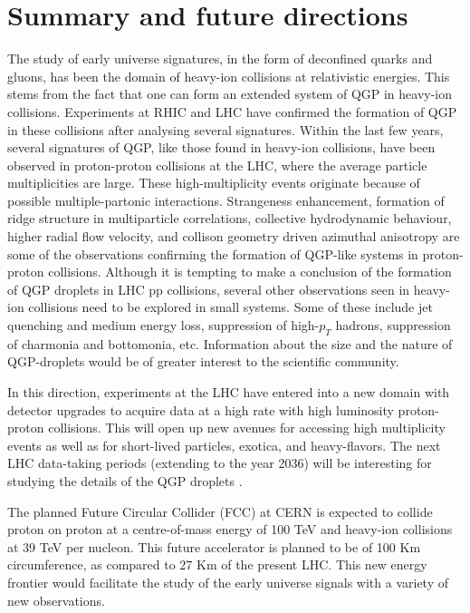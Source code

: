 \documentclass[showpacs,showkeys,aps,twocolumn]{revtex4}
\newcommand\+{\dagger}
\begin{document}
\section{Summary and future directions}
The study of early universe signatures, in the form of deconfined quarks and gluons, has been the domain of heavy-ion collisions at relativistic energies. This stems from the fact that one can form an extended system of  QGP in heavy-ion collisions. Experiments at RHIC and LHC have confirmed the formation of QGP in these collisions after analysing several signatures. Within the last few years, several signatures of QGP, like those found in  heavy-ion collisions, have been observed in proton-proton collisions at the LHC, where the average particle multiplicities are large. These high-multiplicity events originate because of possible multiple-partonic interactions. Strangeness enhancement, formation of ridge structure in multiparticle correlations, collective hydrodynamic behaviour, higher radial flow velocity, and collison geometry driven azimuthal anisotropy are some of the observations confirming  the formation of QGP-like systems in proton-proton collisions. Although it is tempting to make a conclusion of the formation of QGP droplets in LHC pp collisions, several other observations seen in heavy-ion collisions need to be explored in small systems. Some of these include jet quenching and medium energy loss, suppression of high-$p_T$ hadrons, suppression of charmonia and bottomonia, etc. Information about the size and the nature of QGP-droplets would be of greater interest to the scientific community. 

In this direction, experiments at the LHC have entered into a new domain with detector upgrades to acquire data at a high rate with high luminosity proton-proton collisions. This will open up new avenues for accessing high multiplicity events as well as for short-lived particles, exotica, and heavy-flavors. The next LHC data-taking periods (extending to the year 2036) will be interesting for studying the details of the QGP droplets \cite{Ref29}.

The planned Future Circular Collider (FCC) \cite{Ref30} at CERN is expected to collide proton on proton at a centre-of-mass energy of 100 TeV and heavy-ion collisions at 39 TeV per nucleon. This future accelerator is planned to be of 100 Km circumference, as compared to 27 Km of the present LHC. This new energy frontier would facilitate the study of the early universe signals with a variety of new observations.
\end{document}
